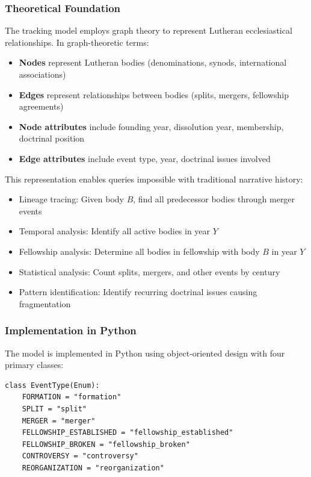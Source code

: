 \subsubsection{Theoretical Foundation}

The tracking model employs graph theory to represent Lutheran ecclesiastical relationships. In graph-theoretic terms:

\begin{itemize}
\item \textbf{Nodes} represent Lutheran bodies (denominations, synods, international associations)
\item \textbf{Edges} represent relationships between bodies (splits, mergers, fellowship agreements)
\item \textbf{Node attributes} include founding year, dissolution year, membership, doctrinal position
\item \textbf{Edge attributes} include event type, year, doctrinal issues involved
\end{itemize}

This representation enables queries impossible with traditional narrative history:

\begin{itemize}
\item Lineage tracing: Given body $B$, find all predecessor bodies through merger events
\item Temporal analysis: Identify all active bodies in year $Y$
\item Fellowship analysis: Determine all bodies in fellowship with body $B$ in year $Y$
\item Statistical analysis: Count splits, mergers, and other events by century
\item Pattern identification: Identify recurring doctrinal issues causing fragmentation
\end{itemize}

\subsubsection{Implementation in Python}

The model is implemented in Python using object-oriented design with four primary classes:

\begin{verbatim}
class EventType(Enum):
    FORMATION = "formation"
    SPLIT = "split"
    MERGER = "merger"
    FELLOWSHIP_ESTABLISHED = "fellowship_established"
    FELLOWSHIP_BROKEN = "fellowship_broken"
    CONTROVERSY = "controversy"
    REORGANIZATION = "reorganization"
\end{verbatim}

